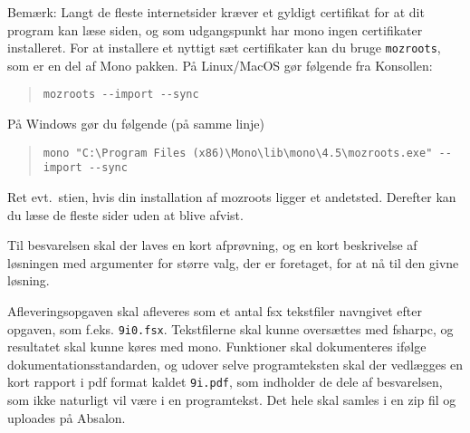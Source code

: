 \documentclass[a4paper,12pt]{article}
\begin{document}
\begin{enumerate}[label=9i.\arabic*,start=0]
  Bemærk: Langt de fleste internetsider kræver et gyldigt certifikat for at dit program kan læse siden, og som udgangspunkt har mono ingen certifikater installeret. For at installere et nyttigt sæt certifikater kan du bruge \lstinline[language=console]{mozroots}, som er en del af Mono pakken. På Linux/MacOS gør følgende fra Konsollen:
  \begin{quote}
    \lstinline[language=console]{mozroots --import --sync}
  \end{quote}
  På Windows gør du følgende (på samme linje)
  \begin{quote}
    \lstinline[language=console]{mono "C:\Program Files (x86)\Mono\lib\mono\4.5\mozroots.exe" --import --sync}
  \end{quote}
  Ret evt.\ stien, hvis din installation af mozroots ligger et andetsted. Derefter kan du læse de fleste sider uden at blive afvist.

  Til besvarelsen skal der laves en kort afprøvning, og en kort beskrivelse af løsningen med argumenter for større valg, der er foretaget, for at nå til den givne løsning.
\end{enumerate}

Afleveringsopgaven skal afleveres som et antal fsx tekstfiler navngivet efter opgaven, som f.eks. \lstinline!9i0.fsx!. Tekstfilerne skal kunne oversættes med fsharpc, og resultatet skal kunne køres med mono. Funktioner skal dokumenteres ifølge dokumentationsstandarden, og udover selve programteksten skal der vedlægges en kort rapport i pdf format kaldet \lstinline{9i.pdf}, som indholder de dele af besvarelsen, som ikke naturligt vil være i en programtekst. Det hele skal samles i en zip fil og uploades på Absalon.
\end{document}

